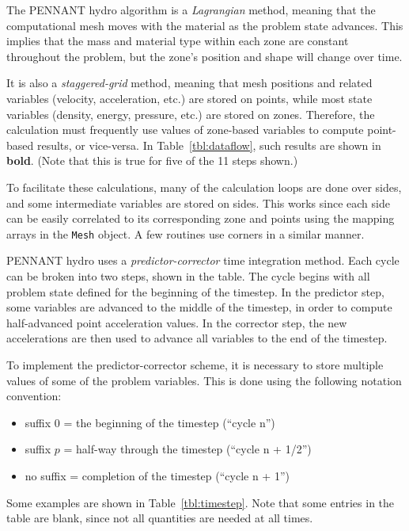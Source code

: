 \documentclass[11pt,letterpaper]{article}
\begin{document}
The PENNANT hydro algorithm is a {\em Lagrangian} method, meaning that
the computational mesh moves with the material as the problem state
advances.  This implies that the mass and material type within each zone
are constant throughout the problem, but the zone's position and shape
will change over time.

It is also a {\em staggered-grid} method, meaning that mesh positions and
related variables (velocity, acceleration, etc.) are stored on points,
while most state variables (density, energy, pressure, etc.) are stored
on zones.  Therefore, the calculation must frequently use values of
zone-based variables to compute point-based results, or vice-versa.
In Table~\ref{tbl:dataflow}, such results are shown in {\bf bold}.
(Note that this is true for five of the 11 steps shown.)

To facilitate these calculations, many of the calculation loops are done
over sides, and some intermediate variables are stored on sides.
This works since each side can be easily correlated to its
corresponding zone and points using the mapping arrays in the {\tt Mesh}
object.  A few routines use corners in a similar manner.

PENNANT hydro uses a {\em predictor-corrector} time integration
method.  Each cycle can be broken into two steps, shown in the table.
The cycle begins with all problem state defined for the beginning of the
timestep.  In the predictor step, some variables are advanced to the
middle of the timestep, in order to compute half-advanced point
acceleration values.  In the corrector step, the new accelerations are
then used to advance all variables to the end of the timestep.

To implement the predictor-corrector scheme, it is necessary to store
multiple values of some of the problem variables.  This is done
using the following notation convention:
\begin{itemize} \itemsep1pt \parskip0pt
\item suffix $0$ = the beginning of the timestep (``cycle n'')
\item suffix $p$ = half-way through the timestep (``cycle n + 1/2'')
\item no suffix = completion of the timestep    (``cycle n + 1'')
\end{itemize}
Some examples are shown in Table~\ref{tbl:timestep}.
Note that some entries in the table are blank, since not all quantities
are needed at all times.
\end{document}
